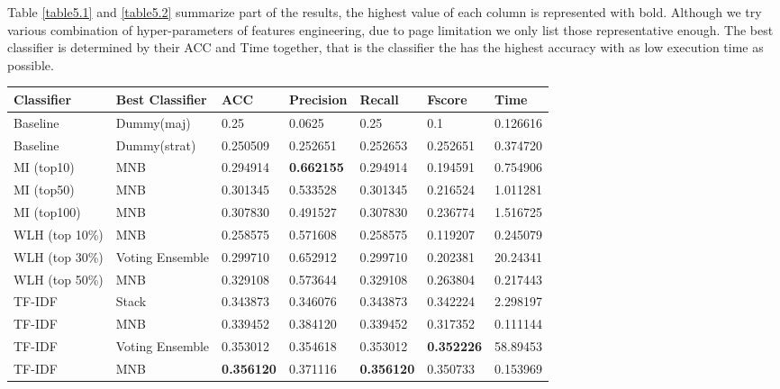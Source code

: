 \documentclass[11pt]{article}
\begin{document}
Table \ref{table5.1} and \ref{table5.2} summarize part of the results, the highest value of each column is represented with bold. Although we try various combination of hyper-parameters of features engineering, due to page limitation we only list those representative enough. The best classifier is determined by their ACC and Time together, that is the classifier the has the highest accuracy with as low execution time as possible.

\begin{table*}[h]
 \begin{center}
\begin{tabular}{|l|l|l|l|l|l|l|}

      \hline
      Classifier & Best Classifier & ACC & Precision & Recall & Fscore & Time \\
      \hline\hline
      Baseline & Dummy(maj) & 0.25 & 0.0625 & 0.25 & 0.1 & 0.126616 \\
      \hline
	  Baseline & Dummy(strat) & 0.250509 & 0.252651 & 0.252653 & 0.252651 & 0.374720 \\
	  \hline
	  MI (top10) & MNB & 0.294914 & \textbf{0.662155} & 0.294914 & 0.194591 & 0.754906 \\
	  \hline
      MI (top50) & MNB & 0.301345 & 0.533528 & 0.301345 & 0.216524 & 1.011281 \\
      \hline
      MI (top100) & MNB & 0.307830 & 0.491527 & 0.307830 & 0.236774 & 1.516725 \\
      \hline
      WLH (top 10\%) & MNB & 0.258575 & 0.571608 & 0.258575 & 0.119207 & 0.245079 \\
      \hline
      WLH (top 30\%) & Voting Ensemble & 0.299710 & 0.652912 & 0.299710 & 0.202381 & 20.24341 \\
      \hline
      WLH (top 50\%) & MNB & 0.329108 & 0.573644 & 0.329108 & 0.263804 & 0.217443 \\
      \hline
      TF-IDF \tnote{1} & Stack & 0.343873 & 0.346076 & 0.343873 & 0.342224 & 2.298197 \\
      \hline
      TF-IDF \tnote{2} & MNB & 0.339452 & 0.384120 & 0.339452 & 0.317352 & 0.111144 \\
      \hline
      TF-IDF \tnote{3} & Voting Ensemble & 0.353012 & 0.354618 & 0.353012 & \textbf{0.352226} & 58.89453 \\
      \hline
      TF-IDF \tnote{4} & MNB & \textbf{0.356120} & 0.371116 & \textbf{0.356120} & 0.350733 & 0.153969 \\ 
      \hline
      

\end{tabular}
\end{center}
\end{table*}
\end{document}
